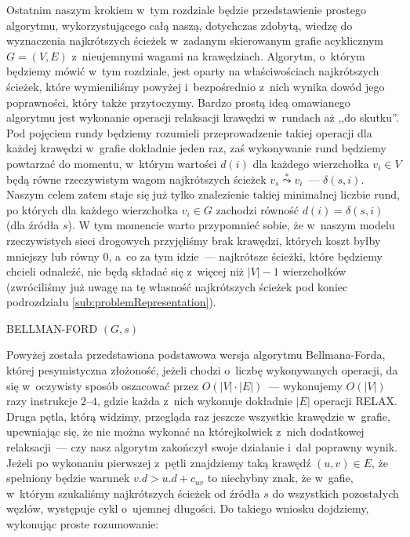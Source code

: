 Ostatnim naszym krokiem w~tym rozdziale będzie przedstawienie prostego algorytmu, wykorzystującego całą naszą, dotychczas zdobytą, wiedzę do wyznaczenia najkrótszych ścieżek w~zadanym skierowanym grafie acyklicznym $G = \left( V, E \right)$ z~nieujemnymi wagami na krawędziach. Algorytm, o~którym będziemy mówić w~tym rozdziale, jest oparty na właściwościach najkrótszych ścieżek, które wymieniliśmy powyżej i~bezpośrednio z~nich wynika dowód jego poprawności, który także przytoczymy. Bardzo prostą ideą omawianego algorytmu jest wykonanie operacji relaksacji krawędzi w~rundach aż ,,do skutku''. Pod pojęciem rundy będziemy rozumieli przeprowadzenie takiej operacji dla każdej krawędzi w~grafie dokładnie jeden raz, zaś wykonywanie rund będziemy powtarzać do momentu, w~którym wartości $ d \left( i \right) $ dla każdego wierzchołka $v_{i} \in V$ będą równe rzeczywistym wagom najkrótszych ścieżek $v_{s} \overset{*}\leadsto v_{i}$~--- $\delta \left( s,i \right)$. Naszym celem zatem staje się już tylko znalezienie takiej minimalnej liczbie rund, po których dla każdego wierzchołka $ v_{i} \in G $ zachodzi równość $ d \left( i \right) = \delta \left( s, i \right) $ (dla źródła $ s $). W tym momencie warto przypomnieć sobie, że w~naszym modelu rzeczywistych sieci drogowych przyjęliśmy brak krawędzi, których koszt byłby mniejszy lub równy $ 0 $, a~co za tym idzie~--- najkrótsze ścieżki, które będziemy chcieli odnaleźć, nie będą składać się z~więcej niż $ \left| V \right| - 1 $ wierzchołków (zwróciliśmy już uwagę na tę własność najkrótszych ścieżek pod koniec podrozdziału \ref{sub:problemRepresentation}).

\begin{pseudokod}[!htbp]
\DontPrintSemicolon
{}
\caption{ BELLMAN-FORD $\left( G, s \right)$\label{alg:BellmanFord}}
\end{pseudokod}

Powyżej została przedstawiona podstawowa wersja algorytmu Bellmana-Forda, której pesymistyczna złożoność, jeżeli chodzi o~liczbę wykonywanych operacji, da się w~oczywisty sposób oszacować przez $ O \left( \left| V \right| \cdot \left| E \right| \right) $~---  wykonujemy $ O \left( \left| V \right| \right) $ razy instrukcje $2$--$4$, gdzie każda z~nich wykonuje dokładnie $ \left| E \right| $ operacji \textsf{RELAX}. Druga pętla, którą widzimy, przegląda raz jeszcze wszystkie krawędzie w~grafie, upewniając się, że nie można wykonać na którejkolwiek z~nich dodatkowej relaksacji~--- czy nasz algorytm zakończył swoje działanie i~dał poprawny wynik. Jeżeli po wykonaniu pierwszej z~pętli znajdziemy taką krawędź $ \left( u, v \right) \in E $, że spełniony będzie warunek $ v.d > u.d + c_{uv}$ to niechybny znak, że w~gafie, w~którym szukaliśmy najkrótszych ścieżek od źródła $s$ do wszystkich pozostałych węzłów, występuje cykl o~ujemnej długości. Do takiego wniosku dojdziemy, wykonując proste rozumowanie:


